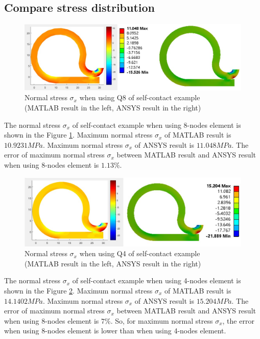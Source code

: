 \subsection{Compare stress distribution}
\begin{figure}[H]
    \centering
    \includegraphics[scale=0.575]{Figures/sx_self_MandA.jpg}
    \decoRule
    \caption{Normal stress $\sigma_x$ when using Q8 of self-contact example \\
    (MATLAB result in the left, ANSYS result in the right)}
    \label{fig:sx_self_MandA_5}
\end{figure}
\noindent
The normal stress $\sigma_x$ of self-contact example when using 8-nodes element is shown in the Figure \ref{fig:sx_self_MandA_5}.
Maximum normal stress $\sigma_x$ of MATLAB result is $10.9231 MPa$.
Maximum normal stress $\sigma_x$ of ANSYS result is $11.048 MPa$.
The error of maximum normal stress $\sigma_x$ between MATLAB result and ANSYS result when using 8-nodes element is $1.13\%$.
\newline
\begin{figure}[H]
    \centering
    \includegraphics[scale=0.54]{Figures/chapter5/sx_q4_c.jpg}
    \decoRule
    \caption{Normal stress $\sigma_x$ when using Q4 of self-contact example \\
    (MATLAB result in the left, ANSYS result in the right)}
    \label{fig:sx_q4_c}
\end{figure}
\noindent
The normal stress $\sigma_x$ of self-contact example when using 4-nodes element is shown in the Figure \ref{fig:sx_q4_c}.
Maximum normal stress $\sigma_x$ of MATLAB result is $14.1402 MPa$.
Maximum normal stress $\sigma_x$ of ANSYS result is $15.204 MPa$.
The error of maximum normal stress $\sigma_x$ between MATLAB result and ANSYS result when using 8-nodes element is $7\%$.
So, for maximum normal stress $\sigma_x$, the error when using 8-nodes element is lower than when using 4-nodes element.
\newpage


